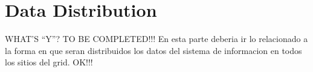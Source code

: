 \section{Data Distribution}

\begin{com}
WHAT'S ``Y''? TO BE COMPLETED!!!
En esta parte deberia ir lo relacionado a la forma en que seran
distribuidos los datos del sistema de informacion en todos los
sitios del grid. OK!!!
\end{com}
